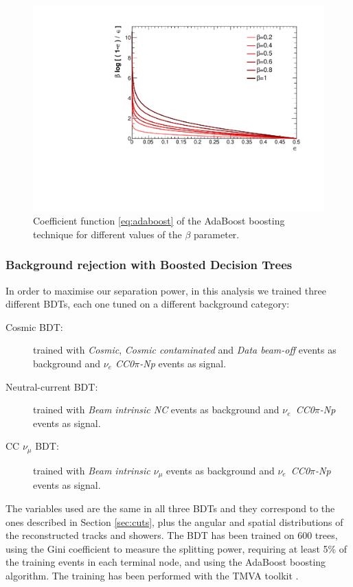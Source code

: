 \begin{figure}[htbp]
\centering
  \includegraphics[width=0.75\linewidth]{figures/adaboost.pdf}
  \caption{Coefficient function \eqref{eq:adaboost} of the AdaBoost boosting technique for different values of the $\beta$ parameter.}
  \label{fig:adaboost}
\end{figure}

\subsubsection{Background rejection with Boosted Decision Trees}
In order to maximise our separation power, in this analysis we trained three different BDTs, each one tuned on a different background category:
\begin{description}
\item[Cosmic BDT:] trained with \emph{Cosmic}, \emph{Cosmic contaminated} and \emph{Data beam-off} events as background and \emph{$\nu_e$ CC0$\pi$-Np} events as signal. 
\item[Neutral-current BDT:] trained with \emph{Beam intrinsic NC} events as background and \emph{$\nu_e$~CC0$\pi$-Np} events as signal. 
\item[CC $\nu_{\mu}$ BDT:] trained with \emph{Beam intrinsic $\nu_{\mu}$} events as background and \emph{$\nu_e$~CC0$\pi$-Np} events as signal. 
\end{description}

The variables used are the same in all three BDTs and they correspond to the ones described in Section \ref{sec:cuts}, plus the angular and spatial distributions of the reconstructed tracks and showers. The BDT has been trained on 600 trees, using the Gini coefficient to measure the splitting power, requiring at least 5\% of the training events in each terminal node, and using the AdaBoost boosting algorithm. The training has been performed with the TMVA toolkit \cite{Hocker:2007ht}. 

